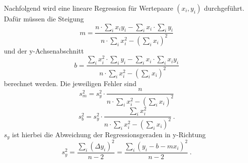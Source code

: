 Nachfolgend wird eine lineare Regression für Wertepaare $(x_i,y_i)$ durchgeführt. Dafür müssen die Steigung
\begin{equation}
	m = \dfrac{
		n\cdot\sum\limits_{i}x_iy_i-\sum\limits_{i}x_i\cdot\sum\limits_{i}y_i
		}
		{n\cdot\sum\limits_{i}x_i^2-\left(\sum\limits_{i}x_i\right)^2
		}
\end{equation}
und der y-Achsenabschnitt
\begin{equation}
	b = \dfrac{
		\sum\limits_{i}x_i^2\cdot\sum\limits_{i}y_i-\sum\limits_{i}x_i\cdot\sum\limits_{i}x_iy_i
		}{
		n\cdot\sum\limits_{i}x_i^2-\left(\sum\limits_{i}x_i\right)^2
		}
\end{equation}
berechnet werden. Die jeweiligen Fehler sind
\begin{equation}
	s_m^2 = s_y^2 \cdot \dfrac{n}{n\cdot\sum\limits_{i}x_i^2-\left(\sum\limits_{i}x_i\right)^2}
\end{equation}
\begin{equation}
	s_b^2 = s_y^2 \cdot \dfrac{\sum\limits_{i}x_i^2}{n\cdot\sum\limits_{i}x_i^2-\left(\sum\limits_{i}x_i\right)^2}\ .
\end{equation}
$s_y$ ist hierbei die Abweichung der Regressionsgeraden in y-Richtung
\begin{equation}
	s_y^2 = \dfrac{\sum\limits_{i}\left(\Delta y_i\right)^2}{n-2} = \dfrac{\sum\limits_{i}\left(y_i-b-mx_i\right)^2}{n-2} \ .
\end{equation}